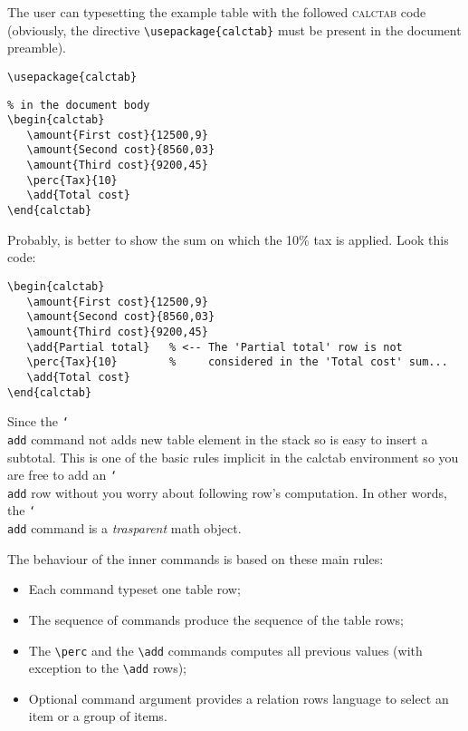 \documentclass[a4paper]{article}
\newcommand{\ct}{\textsc{calctab}} %
\newcommand{\env}[1]{\textsf{#1}}
\newcommand{\cmd}[1]{\texttt{\char`\\#1}}
\begin{document}
\begin{calctab}
\end{calctab}

The user can typesetting the example table with the followed \ct{} code (obviously, the directive \verb=\usepackage{calctab}= must be present in the document preamble).

{\color{blue}
\begin{Verbatim}[numbers=none]
% in the document preamble
\usepackage{calctab}
\end{Verbatim}
}

\begin{Verbatim}
% in the document body
\begin{calctab}
   \amount{First cost}{12500,9}
   \amount{Second cost}{8560,03}
   \amount{Third cost}{9200,45}
   \perc{Tax}{10}
   \add{Total cost}
\end{calctab}
\end{Verbatim}

Probably, is better to show the sum on which the 10\% tax is applied. Look this code:


\begin{Verbatim}
\begin{calctab}
   \amount{First cost}{12500,9}
   \amount{Second cost}{8560,03}
   \amount{Third cost}{9200,45}
   \add{Partial total}   % <-- The 'Partial total' row is not
   \perc{Tax}{10}        %     considered in the 'Total cost' sum...
   \add{Total cost}
\end{calctab}
\end{Verbatim}

Since the \cmd{add} command not adds new table element in the stack so is easy to insert a subtotal. This is one of the basic rules implicit in the \env{calctab} environment so you are free to add an \cmd{add} row without you worry about following row's computation. In other words, the \cmd{add} command is a \emph{trasparent} math object.

The behaviour of the inner commands is based on these main rules:

\begin{itemize}
    \item Each command typeset one table row;
    \item The sequence of commands produce the sequence of the table rows;
    \item The \verb=\perc= and the \verb=\add= commands computes all previous values (with exception to the \verb=\add= rows);
    \item Optional command argument provides a relation rows language to select an item or a group of items.
\end{itemize}
\end{document}
